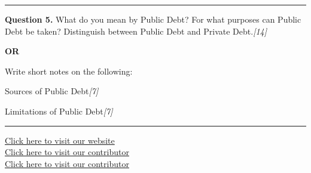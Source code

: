 \documentclass[11pt,a4paper]{article}
\newcommand{\pts}[1]{\hfill   \textit{[#1]}}
\begin{document}
\medskip\rule{\linewidth}{0.2pt}




\noindent   \textbf{Question 5.}
What do you mean by Public Debt? For what purposes can Public Debt be taken? Distinguish between Public Debt and Private Debt.\pts{14}

\centerline{   \textbf{OR}}

Write short notes on the following:

\begin{parts}
  \item Sources of Public Debt\pts{7}
  \item Limitations of Public Debt\pts{7}
\end{parts}

\vfill
\rule{\linewidth}{0.4pt}

\begin{center}\small
\href{https://bhu-exam.vercel.app/}{Click here to visit our website}\\[4pt]
\href{https://me-aryan.vercel.app/}{Click here to visit our contributor}\\[4pt]
\href{https://quashan-me.vercel.app/}{Click here to visit our contributor}
\end{center}
\end{document}
